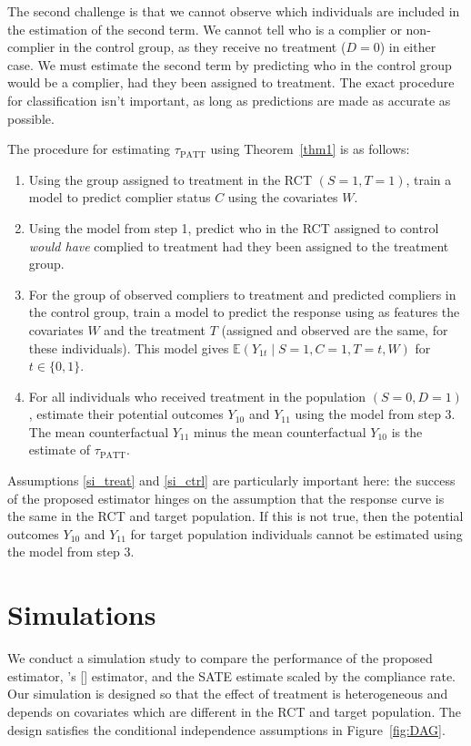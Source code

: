 \documentclass[12pt]{article}
\newcommand{\ex}{\mathbb{E}} %
\newcommand{\possessivecite}[1]{\citeauthor{#1}'s [\citeyear{#1}]}
\begin{document}
The second challenge is that we cannot observe which individuals are included in the estimation of the second term. We cannot tell who is a complier or non-complier in the control group, as they receive no treatment ($D=0$) in either case.  We must estimate the second term by predicting who in the control group would be a complier, had they been assigned to treatment.  The exact procedure for classification isn't important, as long as predictions are made as accurate as possible. 

The procedure for estimating $\tau_{\text{PATT}}$ using Theorem~\ref{thm1} is as follows:
\begin{enumerate}
\item Using the group assigned to treatment in the RCT $(S=1, T=1)$, train a model to predict complier status $C$ using the covariates $W$.
\item Using the model from step 1, predict who in the RCT assigned to control \textit{would have} complied to treatment had they been assigned to the treatment group.
\item For the group of observed compliers to treatment and predicted compliers in the control group, train a model to predict the response using as features the covariates $W$ and the treatment $T$ (assigned and observed are the same, for these individuals).  This model gives $\ex(Y_{1t} \mid S=1, C=1, T=t, W)$ for $t \in \{0,1\}$.
\item For all individuals who received treatment in the population $(S=0, D=1)$, estimate their potential outcomes $Y_{10}$ and $Y_{11}$ using the model from step 3.  The mean counterfactual $Y_{11}$ minus the mean counterfactual $Y_{10}$ is the estimate of $\tau_{\text{PATT}}$.
\end{enumerate}

Assumptions \eqref{si_treat} and \eqref{si_ctrl} are particularly important here: the success of the proposed estimator hinges on the assumption that the response curve is the same in the RCT and target population.  If this is not true, then the potential outcomes $Y_{10}$ and $Y_{11}$ for target population individuals cannot be estimated using the model from step 3.

\section{Simulations} \label{sim}
We conduct a simulation study to compare the performance of the proposed estimator, \possessivecite{Hartman} estimator, and the SATE estimate scaled by the compliance rate.  Our simulation is designed so that the effect of treatment is heterogeneous and depends on covariates which are different in the RCT and target population. The design satisfies the conditional independence assumptions in Figure~\ref{fig:DAG}.
\end{document}
